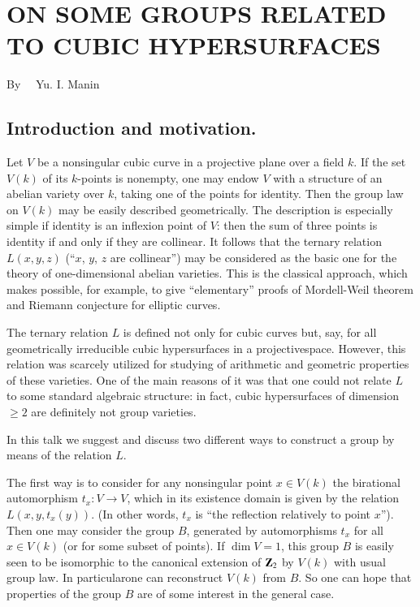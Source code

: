 \chapter[\textsc{Yu. I. Manin~:} On Some Groups Related to Cubic Hyper-surfaces]{ON SOME GROUPS RELATED TO CUBIC HYPERSURFACES}\label{art13}

\begin{center}
By~~ Yu. I. Manin
\end{center}

\setcounter{pageoriginal}{254}
\section*{Introduction and motivation.}
\pageoriginale


Let $V$ be a nonsingular cubic curve in a projective plane over a field $k$. If the set $V(k)$ of its $k$-points is nonempty, one may endow $V$ with a structure of an abelian variety over $k$, taking one of the points for identity. Then the group law on $V(k)$ may be easily described geometrically. The description is especially simple if identity is an inflexion point of $V$: then the sum of three points is identity if and only if they are collinear. It follows that the ternary relation $L(x,y,z)$ (``$x$, $y$, $z$ are collinear'') may be considered as the basic one for the theory of one-dimensional abelian varieties. This is the classical approach, which makes possible, for example, to give ``elementary'' proofs of Mordell-Weil theorem and Riemann conjecture for elliptic curves.

The ternary relation $L$ is defined not only for cubic curves but, say, for all geometrically irreducible cubic hypersurfaces in a projective\break space. However, this relation was scarcely utilized for studying of arithmetic and geometric properties of these varieties. One of the main reasons of it was that one could not relate $L$ to some standard algebraic structure: in fact, cubic hypersurfaces of dimension $\geq 2$ are definitely not group varieties.

In this talk we suggest and discuss two different ways to construct a group by means of the relation $L$.

The first way is to consider for any nonsingular point $x\in V(k)$ the birational automorphism $t_{x}:V\to V$, which in its existence domain is given by the relation $L(x,y,t_{x}(y))$. (In other words, $t_{x}$ is ``the reflection relatively to point $x$''). Then one may consider the group $B$, generated by automorphisms $t_{x}$ for all $x\in V(k)$ (or for some subset of points). If $\dim V=1$, this group $B$ is easily seen to be isomorphic to the canonical extension of $\mathbf{Z}_{2}$ by $V(k)$ with usual group law. In particular\pageoriginale one can reconstruct $V(k)$ from $B$. So one can hope that properties of the group $B$ are of some interest in the general case.

